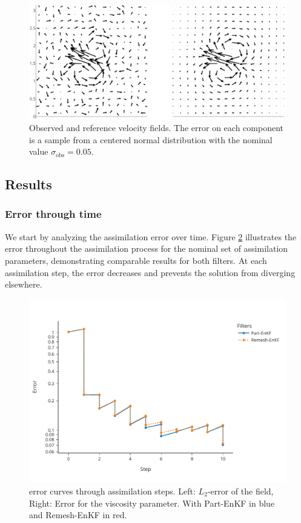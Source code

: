 \begin{figure}[htbp]
    \centering
    \includegraphics[width=0.8\linewidth]{images/app2d/velocity_ref_recadre.pdf}
    \caption{Observed and reference velocity fields. The error on each component is a sample from a centered normal distribution with the nominal value $\sigma_{\text{obs}} = 0.05$.}
    \label{fig:velocity}
\end{figure}

\newpage

\subsection{Results}

\subsubsection{Error through time}

We start by analyzing the assimilation error over time. Figure \ref{fig:assim_time} illustrates the error throughout the assimilation process for the nominal set of assimilation parameters, demonstrating comparable results for both filters. At each assimilation step, the error decreases and prevents the solution from diverging elsewhere.

\begin{figure}[htbp]
    \centering
    \includegraphics*[width=0.7\linewidth]{images/app2d/final/error_in_time.pdf}
    \caption{error curves through assimilation steps. Left: \(L_2\)-error of the field, Right: Error for the viscosity parameter. With Part-EnKF in blue and Remesh-EnKF in red.}
    \label{fig:assim_time}
\end{figure}

